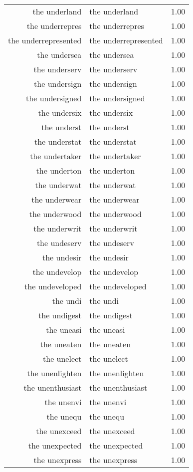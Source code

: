 \begin{table}[ht]
\begin{tabular}{rlr}
  the underland & the underland & 1.00 \\ 
  the underrepres & the underrepres & 1.00 \\ 
  the underrepresented & the underrepresented & 1.00 \\ 
  the undersea & the undersea & 1.00 \\ 
  the underserv & the underserv & 1.00 \\ 
  the undersign & the undersign & 1.00 \\ 
  the undersigned & the undersigned & 1.00 \\ 
  the undersix & the undersix & 1.00 \\ 
  the underst & the underst & 1.00 \\ 
  the understat & the understat & 1.00 \\ 
  the undertaker & the undertaker & 1.00 \\ 
  the underton & the underton & 1.00 \\ 
  the underwat & the underwat & 1.00 \\ 
  the underwear & the underwear & 1.00 \\ 
  the underwood & the underwood & 1.00 \\ 
  the underwrit & the underwrit & 1.00 \\ 
  the undeserv & the undeserv & 1.00 \\ 
  the undesir & the undesir & 1.00 \\ 
  the undevelop & the undevelop & 1.00 \\ 
  the undeveloped & the undeveloped & 1.00 \\ 
  the undi & the undi & 1.00 \\ 
  the undigest & the undigest & 1.00 \\ 
  the uneasi & the uneasi & 1.00 \\ 
  the uneaten & the uneaten & 1.00 \\ 
  the unelect & the unelect & 1.00 \\ 
  the unenlighten & the unenlighten & 1.00 \\ 
  the unenthusiast & the unenthusiast & 1.00 \\ 
  the unenvi & the unenvi & 1.00 \\ 
  the unequ & the unequ & 1.00 \\ 
  the unexceed & the unexceed & 1.00 \\ 
  the unexpected & the unexpected & 1.00 \\ 
  the unexpress & the unexpress & 1.00 \\ 

\end{tabular}
\end{table}
